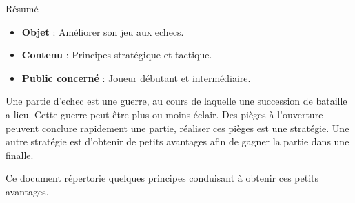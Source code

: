 \begin{center}
\Large
Résumé
\normalsize
\end{center}
\vspace{3cm}
\begin{itemize}[leftmargin=1cm, label=, itemsep=21pt]
\item {\bf Objet} : Améliorer son jeu aux echecs.
\item {\bf Contenu} : Principes stratégique et tactique.
\item {\bf Public concerné} : Joueur débutant et intermédiaire.
\end{itemize}

\vspace{3cm}

Une partie d'echec est une guerre, au cours de laquelle une succession de bataille a lieu. Cette guerre peut être plus ou moins éclair. Des pièges à l'ouverture peuvent conclure rapidement une partie, réaliser ces pièges est une stratégie. Une autre stratégie est d'obtenir de petits avantages afin de gagner la partie dans une finalle.

Ce document répertorie quelques principes conduisant à obtenir ces petits avantages. 



\vspace{3cm}

